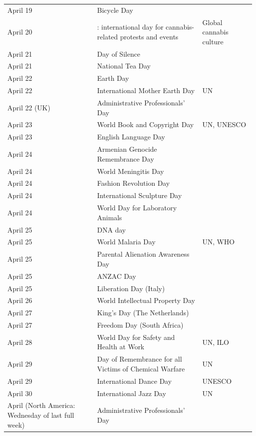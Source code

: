 \documentclass[
  openany]{book}
\begin{document}
\begin{longtable}[t]{>{\raggedright\arraybackslash}p{8em}>{\raggedright\arraybackslash}p{18em}>{\raggedright\arraybackslash}p{10em}}
April 19 & Bicycle Day & \\
\rowcolor{gray!6}  April 20 & 420: international day for cannabis-related protests and events & Global cannabis culture\\
April 21 & Day of Silence & \\
\rowcolor{gray!6}  April 21 & National Tea Day & \\
\addlinespace
April 22 & Earth Day & \\
\rowcolor{gray!6}  April 22 & International Mother Earth Day & UN\\
April 22 (UK) & Administrative Professionals' Day & \\
\rowcolor{gray!6}  April 23 & World Book and Copyright Day & UN, UNESCO\\
April 23 & English Language Day & \\
\addlinespace
\rowcolor{gray!6}  April 24 & Armenian Genocide Remembrance Day & \\
April 24 & World Meningitis Day & \\
\rowcolor{gray!6}  April 24 & Fashion Revolution Day & \\
April 24 & International Sculpture Day & \\
\rowcolor{gray!6}  April 24 & World Day for Laboratory Animals & \\
\addlinespace
April 25 & DNA day & \\
\rowcolor{gray!6}  April 25 & World Malaria Day & UN, WHO\\
April 25 & Parental Alienation Awareness Day & \\
\rowcolor{gray!6}  April 25 & ANZAC Day & \\
April 25 & Liberation Day (Italy) & \\
\addlinespace
\rowcolor{gray!6}  April 26 & World Intellectual Property Day & \\
April 27 & King's Day (The Netherlands) & \\
\rowcolor{gray!6}  April 27 & Freedom Day (South Africa) & \\
April 28 & World Day for Safety and Health at Work & UN, ILO\\
\rowcolor{gray!6}  April 29 & Day of Remembrance for all Victims of Chemical Warfare & UN\\
\addlinespace
April 29 & International Dance Day & UNESCO\\
\rowcolor{gray!6}  April 30 & International Jazz Day & UN\\
April (North America: Wednesday of last full week) & Administrative Professionals' Day & \\

\end{longtable}
\end{document}
